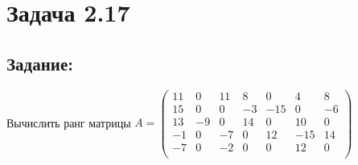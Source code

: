\section{Задача 2.17}
\subsection{Задание:}
Вычислить ранг матрицы $ A =
	\begin{pmatrix}
			11 & 0 & 11 & 8 & 0 & 4 & 8 \\
			15 & 0 & 0 & -3 & -15 & 0 & -6 \\
			13 & -9 & 0 & 14 & 0 & 10 & 0 \\
			-1 & 0 & -7 & 0 & 12 & -15 & 14 \\
			-7 & 0 & -2 & 0 & 0 & 12 & 0 \\
	\end{pmatrix}
$
